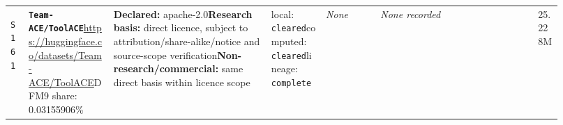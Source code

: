 \documentclass[9pt,a4paper]{article}
\newcommand{\srcid}[1]{\hypertarget{src:#1}{\texttt{#1}}}
\begin{document}
\begin{landscape}
\begin{longtable}{@{}L{0.03\linewidth}L{0.14\linewidth}L{0.26\linewidth}L{0.09\linewidth}L{0.09\linewidth}L{0.265\linewidth}L{0.045\linewidth}@{}}
\srcid{S161} & \textbf{\nolinkurl{Team-ACE/ToolACE}}\newline \url{https://huggingface.co/datasets/Team-ACE/ToolACE}\newline DFM9 share: 0.03155906\% & \textbf{Declared:} apache-2.0\newline \textbf{Research basis:} direct licence, subject to attribution/share-alike/notice and source-scope verification\newline \textbf{Non-research/commercial:} same direct basis within licence scope & local: \texttt{cleared}\newline computed: \texttt{cleared}\newline lineage: \texttt{complete} & \textit{None} & \textit{None recorded} & 25.228M \\
\end{longtable}

\end{landscape}
\end{document}
